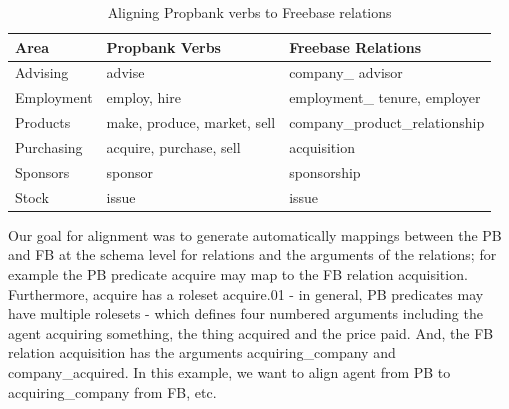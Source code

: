 \begin{table} [ht]
\begin{center}
\small{
\begin{tabular}{p{3cm}p{4cm}p{4.5cm}}
\noalign{\smallskip}
\hline
Area & Propbank Verbs & Freebase Relations\\	
\hline
Advising & advise & company\_ advisor \\
Employment & employ, hire & employment\_ tenure, employer\\
Products & make, produce, market, sell & company\_product\_relationship\\
Purchasing	& acquire, purchase, sell	& acquisition\\
Sponsors	&sponsor	&sponsorship\\
Stock	&issue&	issue\\
\hline
\end{tabular}
}
\caption{Aligning Propbank verbs to Freebase relations}
\vspace{-0.4cm}
\end{center}
\end{table}

Our goal for alignment was to generate automatically mappings between the PB and FB at the schema level for relations and the arguments of the relations; for example the PB predicate acquire may map to the FB relation acquisition.
Furthermore, acquire has a roleset acquire.01 - in general, PB predicates may have multiple rolesets - which defines four numbered arguments including the agent acquiring something, the thing acquired and the price paid.
And, the FB relation acquisition has the arguments acquiring\_company and company\_acquired.
In this example, we want to align agent from PB to acquiring\_company from FB, etc. 

